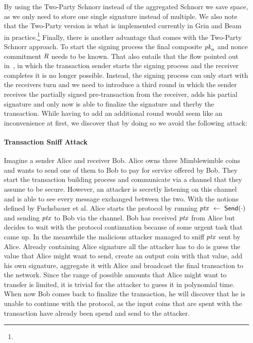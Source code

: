 By using the Two-Party Schnorr instead of the aggregated Schnorr we save space, as we only need to store one single signature instead of multiple.
We also note that the Two-Party version is what is implemented currently in Grin and Beam in practice.\footnote{\urlgrinexplained}
Finally, there is another advantage that comes with the Two-Party Schnorr approach.
To start the signing process the final composite $\mathit{pk}_a$ and nonce commitment $\mathit{R}$ needs to be known.
That also entails that the flow pointed out in~\cite{fuchsbauer2019aggregate}, in which the transaction sender starts the signing process and the receiver completes it is no longer possible.
Instead, the signing process can only start with the receivers turn and we need to introduce a third round in which the sender receives the partially signed pre-transaction from the receiver, adds his partial signature and only now is able to finalize the signature and therby the transaction.
While having to add an additional round would seem like an inconvenience at first, we discover that by doing so we avoid the following attack:

\paragraph{Transaction Sniff Attack} Imagine a sender Alice and receiver Bob.
Alice owns three Mimblewimble coins and wants to send one of them to Bob to pay for service offered by Bob.
They start the transaction building process and communicate via a channel that they assume to be secure.
However, an attacker is secretly listening on this channel and is able to see every message exchanged between the two.
With the notions defined by Fuchsbauer et al. Alice starts the protocol by running $\mathit{ptx} ~\leftarrow~ \mathsf{Send}(\cdot)$ and sending $\mathit{ptx}$ to Bob via the channel.
Bob has received $\mathit{ptx}$ from Alice but decides to wait with the protocol continuation because of some urgent task that came up.
In the meanwhile the malicious attacker managed to sniff $\mathit{ptx}$ sent by Alice.
Already containing Alice signature all the attacker has to do is guess the value that Alice might want to send, create an output coin with that value, add his own signature, aggregate it with Alice and broadcast the final transaction to the network.
Since the range of possible amounts that Alice might want to transfer is limited, it is trivial for the attacker to guess it in polynomial time.
When now Bob comes back to finalize the transaction, he will discover that he is unable to continue with the protocol, as the input coins that are spent with the transaction have already been spend and send to the attacker.

